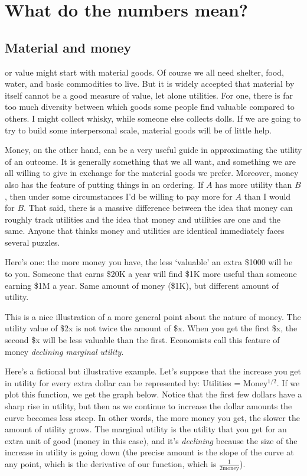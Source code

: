 \documentclass[]{tufte-book}
\begin{document}
\hypertarget{what-do-the-numbers-mean}{%
\section{What do the numbers mean?}\label{what-do-the-numbers-mean}}

\hypertarget{material-and-money}{%
\subsection{Material and money}\label{material-and-money}}

 or value might start with material goods. Of course we all need shelter, food, water, and basic commodities to live. But it is widely accepted that material by itself cannot be a good measure of value, let alone utilities. For one, there is far too much diversity between which goods some people find valuable compared to others. I might collect whisky, while someone else collects dolls. If we are going to try to build some interpersonal scale, material goods will be of little help.

Money, on the other hand, can be a very useful guide in approximating the utility of an outcome. It is generally something that we all want, and something we are all willing to give in exchange for the material goods we prefer. Moreover, money also has the feature of putting things in an ordering. If \(A\) has more utility than \(B\), then under some circumstances I'd be willing to pay more for \(A\) than I would for \(B\). That said, there is a massive difference between the idea that money can roughly track utilities and the idea that money and utilities are one and the same. Anyone that thinks money and utilities are identical immediately faces several puzzles.

Here's one: the more money you have, the less `valuable' an extra \$1000 will be to you. Someone that earns \$20K a year will find \$1K more useful than someone earning \$1M a year. Same amount of money (\$1K), but different amount of utility.

This is a nice illustration of a more general point about the nature of money. The utility value of \$2x is not twice the amount of \$x. When you get the first \$x, the second \$x will be less valuable than the first. Economists call this feature of money \emph{declining marginal utility}.

Here's a fictional but illustrative example. Let's suppose that the increase you get in utility for every extra dollar can be represented by: Utilities = Money\(^{1/2}\). If we plot this function, we get the graph below. Notice that the first few dollars have a sharp rise in utility, but then as we continue to increase the dollar amounts the curve becomes less steep. In other words, the more money you get, the slower the amount of utility grows. The marginal utility is the utility that you get for an extra unit of good (money in this case), and it's \emph{declining} because the size of the increase in utility is going down (the precise amount is the slope of the curve at any point, which is the derivative of our function, which is \(\frac{1}{2\text{money}}\)).
\end{document}
